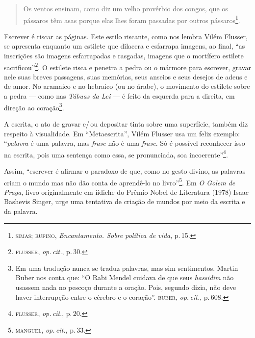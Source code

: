 \begin{quote}
Os ventos ensinam, como diz um velho provérbio dos congos, que os
pássaros têm asas porque elas lhes foram passadas por outros
pássaros\footnote{\textsc{simas}; \textsc{rufino}, \emph{Encantamento. Sobre política de
  vida}, p.\,15.}.
\end{quote}

\begin{center}\end{center}

\noindent{}Escrever é riscar as páginas. Este estilo riscante, como nos lembra
Vilém Flusser, se apresenta enquanto um estilete que dilacera e
esfarrapa imagens, ao final, ``as inscrições são imagens
esfarrapadas e rasgadas, imagens que o mortífero estilete
sacrificou''\footnote{\textsc{flusser}, \emph{op.\,cit.}, p.\,30.}. O estilete risca e
penetra a pedra ou o mármore para escrever, gravar nele suas breves
passagens, suas memórias, seus anseios e seus desejos de adeus e de
amor. No aramaico e no hebraico (ou no árabe), o movimento do estilete
sobre a pedra --- como nas \emph{Tábuas da Lei} --- é feito da esquerda
para a direita, em direção ao coração\footnote{Em uma tradução nunca se
  traduz palavras, mas sim sentimentos. Martin Buber nos conta que:
``O Rabi Mendel cuidava de que seus \emph{hassidim} não usassem nada no
  pescoço durante a oração. Pois, segundo dizia, não deve haver
  interrupção entre o cérebro e o coração''. \textsc{buber}, \emph{op.\,cit.}, p.\,608.}.

A escrita, o ato de gravar e/\,ou depositar tinta sobre uma superfície,
também diz respeito à visualidade. Em ``Metaescrita'', Vilém Flusser usa
um feliz exemplo: ``\emph{palavra} é uma palavra, mas \emph{frase} não é
uma \emph{frase}. Só é possível reconhecer isso na escrita, pois uma sentença
como essa, se pronunciada, soa incoerente''\footnote{\textsc{flusser}, \emph{op.\,cit}., p.\,20.}.

Assim, ``escrever é afirmar o paradoxo de que, como no gesto
divino, as palavras criam o mundo mas não dão conta de aprendê-lo no
livro''\footnote{\textsc{manguel}, \emph{op.\,cit.}, p.\,33.}. Em \emph{O Golem de
Praga}, livro originalmente em iídiche do Prêmio Nobel de
Literatura (1978) Isaac Bashevis Singer, urge uma tentativa de criação
de mundos por meio da escrita e da palavra.

